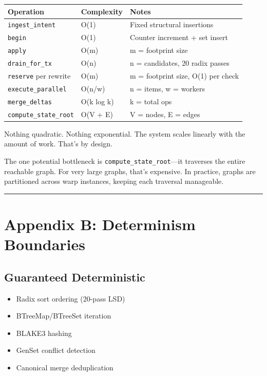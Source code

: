 \documentclass[11pt]{book}
\newcounter{none}
\providecommand{\tightlist}{%
  \setlength{\itemsep}{0pt}\setlength{\parskip}{0pt}}
\newenvironment{directors}
{\begin{mdframed}[
  linecolor=blue!60,
  linewidth=2pt,
  leftline=true,
  rightline=false,
  topline=false,
  bottomline=false,
  backgroundcolor=blue!3,
  innerleftmargin=12pt,
  innerrightmargin=10pt,
  innertopmargin=8pt,
  innerbottommargin=8pt,
  skipabove=12pt,
  skipbelow=12pt
]\small\sffamily\color{blue!70!black}}
{\end{mdframed}}
\begin{document}
{\def\LTcaptype{none}
\begin{longtable}[]{@{}lll@{}}
\toprule\noalign{}
Operation & Complexity & Notes \\
\midrule\noalign{}
\endhead
\bottomrule\noalign{}
\endlastfoot
\texttt{ingest\_intent} & O(1) & Fixed structural insertions \\
\texttt{begin} & O(1) & Counter increment + set insert \\
\texttt{apply} & O(m) & m = footprint size \\
\texttt{drain\_for\_tx} & O(n) & n = candidates, 20 radix passes \\
\texttt{reserve} per rewrite & O(m) & m = footprint size, O(1) per check \\
\texttt{execute\_parallel} & O(n/w) & n = items, w = workers \\
\texttt{merge\_deltas} & O(k log k) & k = total ops \\
\texttt{compute\_state\_root} & O(V + E) & V = nodes, E = edges \\
\end{longtable}
}

\begin{directors}
Nothing quadratic. Nothing exponential. The system scales linearly with the amount of work. That's by design.

The one potential bottleneck is \texttt{compute\_state\_root}---it traverses the entire reachable graph. For very large graphs, that's expensive. In practice, graphs are partitioned across warp instances, keeping each traversal manageable.
\end{directors}

\begin{center}\rule{0.5\linewidth}{0.5pt}\end{center}

\section{Appendix B: Determinism Boundaries}\label{appendix-b-determinism-boundaries}

\subsection{Guaranteed Deterministic}

\begin{itemize}
\tightlist
\item Radix sort ordering (20-pass LSD)
\item BTreeMap/BTreeSet iteration
\item BLAKE3 hashing
\item GenSet conflict detection
\item Canonical merge deduplication
\end{itemize}
\end{document}
